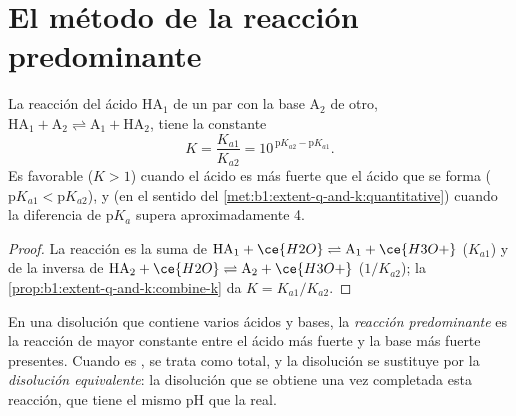 \section{El método de la reacción predominante}

\begin{proposition}\label{prop:b1:predominant-reaction:k-of-reaction}
La reacción del ácido $\mathrm{HA}_1$ de un par con la base
$\mathrm{A}_2$ de otro,
$\mathrm{HA}_1 + \mathrm{A}_2 \rightleftharpoons \mathrm{A}_1 + \mathrm{HA}_2$,
tiene la constante
\[
  K = \frac{K_{a1}}{K_{a2}} = 10^{\,\mathrm{p}K_{a2} - \mathrm{p}K_{a1}} .
\]
Es favorable ($K > 1$) cuando el ácido es más fuerte que el ácido que se
forma ($\mathrm{p}K_{a1} < \mathrm{p}K_{a2}$), y  (en el
sentido del \cref{met:b1:extent-q-and-k:quantitative}) cuando la
diferencia de $\mathrm{p}K_a$ supera aproximadamente 4.
\end{proposition}

\begin{proof}
La reacción es la suma de $\mathrm{HA}_1 + \ce{H2O} \rightleftharpoons
\mathrm{A}_1 + \ce{H3O+}$ ($K_{a1}$) y de la inversa de $\mathrm{HA}_2 +
\ce{H2O} \rightleftharpoons \mathrm{A}_2 + \ce{H3O+}$ ($1/K_{a2}$);
la \cref{prop:b1:extent-q-and-k:combine-k} da $K = K_{a1}/K_{a2}$.
\end{proof}

\begin{definition}\label{def:b1:predominant-reaction:predominant-reaction}
En una disolución que contiene varios ácidos y bases, la \emph{reacción
predominante} es la reacción de mayor constante
entre el ácido más fuerte y la base más fuerte presentes. Cuando es
, se trata como total, y la disolución se sustituye por la
\emph{disolución equivalente}: la disolución que
se obtiene una vez completada esta reacción, que tiene el mismo pH que la
real.
\end{definition}

